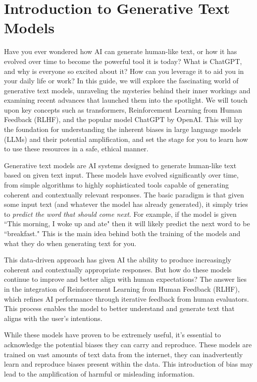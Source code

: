 \documentclass[12pt]{article}
\begin{document}
\section{Introduction to Generative Text Models}
\label{sec:intro}
Have you ever wondered how AI can generate human-like text, or how it has evolved over time to become the powerful tool it is today? What is ChatGPT, and why is everyone so excited about it? How can you leverage it to aid you in your daily life or work? In this guide, we will explore the fascinating world of generative text models, unraveling the mysteries behind their inner workings and examining recent advances that launched them into the spotlight. We will touch upon key concepts such as transformers, Reinforcement Learning from Human Feedback (RLHF), and the popular model ChatGPT by OpenAI. This will lay the foundation for understanding the inherent biases in large language models (LLMs) and their potential amplification, and set the stage for you to learn how to use these resources in a safe, ethical manner.

Generative text models are AI systems designed to generate human-like text based on given text input. 
These models have evolved significantly over time, from simple algorithms to highly sophisticated tools capable of generating coherent and contextually relevant responses.
The basic paradigm is that given some input text (and whatever the model has already generated), it simply tries to \textit{predict the word that should come next}. For example, if the model is given ``This morning, I woke up and ate" then it will likely predict the next word to be ``breakfast." This is the main idea behind both the training of the models and what they do when generating text for you.

This data-driven approach has given AI the ability to produce increasingly coherent and contextually appropriate responses. But how do these models continue to improve and better align with human expectations? The answer lies in the integration of Reinforcement Learning from Human Feedback (RLHF), which refines AI performance through iterative feedback from human evaluators.
This process enables the model to better understand and generate text that aligns with the user's intentions. 

While these models have proven to be extremely useful, it's essential to acknowledge the potential biases they can carry and reproduce. These models are trained on vast amounts of text data from the internet, they can inadvertently learn and reproduce biases present within the data. 
This introduction of bias may lead to the amplification of harmful or misleading information. 
\end{document}
